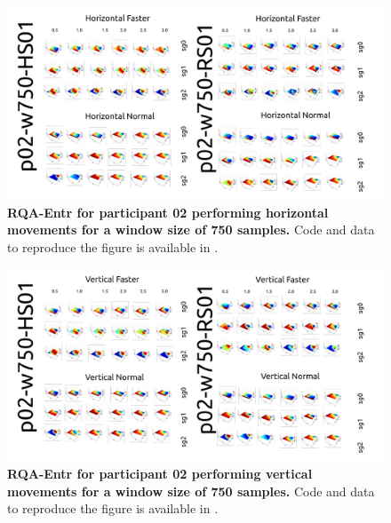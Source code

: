 \documentclass[12pt]{article}
\begin{document}


\newpage
\begin{figure}[ht!]
\centering
\includegraphics{sm-fig15}
    	\caption{
	{\bf RQA-Entr for participant 02 performing horizontal movements for a window size of 750 samples.}
	Code and data to reproduce the figure is available in \cite{srep2021}.
        }
    \label{fig-p02-H-w750}
\end{figure}
\begin{figure}[hb!]
\centering
\includegraphics{sm-fig16}
    	\caption{
	{\bf RQA-Entr for participant 02 performing vertical movements for a window size of 750 samples.}
	Code and data to reproduce the figure is available in \cite{srep2021}.
        }
    \label{fig-p02-V-w750}
\end{figure}
\end{document}
